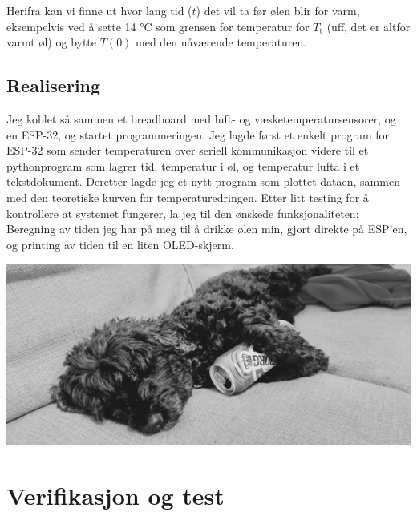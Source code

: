 \documentclass{article}
\begin{document}
Herifra kan vi finne ut hvor lang tid (\(t\)) det vil ta før ølen blir for varm, eksempelvis ved å sette 14 °C som grensen for temperatur for \(T_{\text{t}}\) (uff, det er altfor varmt øl) og bytte \(T(0)\) med den nåværende temperaturen.\\
\subsection{Realisering}
Jeg koblet så sammen et breadboard med luft- og væsketemperatursensorer, og en ESP-32, og startet programmeringen.
Jeg lagde først et enkelt program for ESP-32 som sender temperaturen over seriell kommunikasjon videre til et pythonprogram som lagrer tid, temperatur i øl, og temperatur lufta i et tekstdokument. Deretter lagde jeg et nytt program som plottet dataen, sammen med den teoretiske kurven for temperaturedringen.
Etter litt testing for å kontrollere at systemet fungerer, la jeg til den ønskede funksjonaliteten; Beregning av tiden jeg har på meg til å drikke ølen min, gjort direkte på ESP'en, og printing av tiden til en liten OLED-skjerm.
\vfill
\begin{center}
    \includegraphics[width=15cm]{Tinka_med_pils.jpg}
\end{center}
\newpage
\section{Verifikasjon og test}
\end{document}
